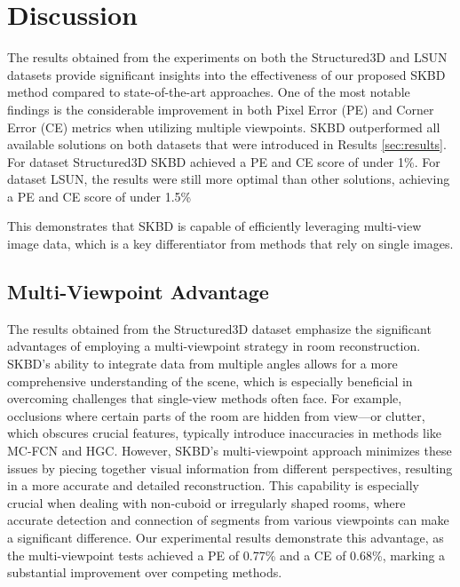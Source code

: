 \section{Discussion}
\label{sec:discussion}

The results obtained from the experiments on both the Structured3D and LSUN datasets provide significant insights into the effectiveness of our proposed SKBD method compared to state-of-the-art approaches. One of the most notable findings is the considerable improvement in both Pixel Error (PE) and Corner Error (CE) metrics when utilizing multiple viewpoints. SKBD outperformed all available solutions on both datasets that were introduced in Results \ref{sec:results}. For dataset Structured3D SKBD achieved a PE and CE score of under 1\%. For dataset LSUN, the results were still more optimal than other solutions, achieving a PE and CE score of under 1.5\%

This demonstrates that SKBD is capable of efficiently leveraging multi-view image data, which is a key differentiator from methods that rely on single images.

\subsection{Multi-Viewpoint Advantage}
The results obtained from the Structured3D dataset emphasize the significant advantages of employing a multi-viewpoint strategy in room reconstruction. SKBD's ability to integrate data from multiple angles allows for a more comprehensive understanding of the scene, which is especially beneficial in overcoming challenges that single-view methods often face. For example, occlusions where certain parts of the room are hidden from view—or clutter, which obscures crucial features, typically introduce inaccuracies in methods like MC-FCN and HGC. However, SKBD’s multi-viewpoint approach minimizes these issues by piecing together visual information from different perspectives, resulting in a more accurate and detailed reconstruction. This capability is especially crucial when dealing with non-cuboid or irregularly shaped rooms, where accurate detection and connection of segments from various viewpoints can make a significant difference. Our experimental results demonstrate this advantage, as the multi-viewpoint tests achieved a PE of 0.77\% and a CE of 0.68\%, marking a substantial improvement over competing methods.

